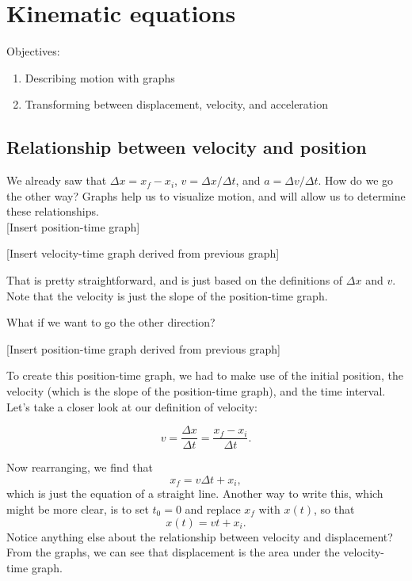\section{Kinematic equations}
Objectives:
\begin{enumerate}
\item Describing motion with graphs
\item Transforming between displacement, velocity, and acceleration
\end{enumerate}


\subsection{Relationship between velocity and position}
We already saw that $\Delta{x}=x_f-x_i$, $v=\Delta{x}/\Delta{t}$, and $a=\Delta{v}/\Delta{t}$. How do we go the other way? Graphs help us to visualize motion, and will allow us to determine these relationships.\\

[Insert position-time graph]
\vspace{5cm}


[Insert velocity-time graph derived from previous graph]\\
\vspace{5cm}

That is pretty straightforward, and is just based on the definitions of $\Delta{x}$ and $v$. Note that the velocity is just the slope of the position-time graph.

What if we want to go the other direction?\\
\vspace{5cm}

[Insert position-time graph derived from previous graph]\\
\vspace{5cm}

To create this position-time graph, we had to make use of the initial position, the velocity (which is the slope of the position-time graph), and the time interval. Let's take a closer look at our definition of velocity:

$$v=\frac{\Delta x}{\Delta t}=\frac{x_f-x_i}{\Delta t}.$$

Now rearranging, we find that
$$x_f=v\Delta{t}+x_i,$$
which is just the equation of a straight line. Another way to write this, which might be more clear, is to set $t_0=0$ and replace $x_f$ with $x(t)$, so that
$$x(t)=vt+x_i.$$
Notice anything else about the relationship between velocity and displacement? From the graphs, we can see that displacement is the area under the velocity-time graph.

